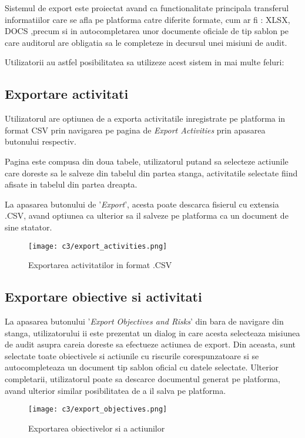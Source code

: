 Sistemul de export este proiectat avand ca functionalitate principala transferul informatiilor care se afla pe platforma catre diferite formate, cum ar fi : XLSX, DOCS ,precum si in autocompletarea unor documente oficiale de tip sablon pe care auditorul are obligatia sa le completeze in decursul unei misiuni de audit.

Utilizatorii au astfel posibilitatea sa utilizeze acest sistem in mai multe feluri:
\subsection*{Exportare activitati}
Utilizatorul are optiunea de a exporta activitatile inregistrate pe platforma in format CSV prin navigarea pe pagina de \textit{Export Activities} prin apasarea butonului respectiv.

Pagina este compusa din doua tabele, utilizatorul putand sa selecteze actiunile care doreste sa le salveze din tabelul din partea stanga, activitatile selectate fiind afisate in tabelul din partea dreapta.

La apasarea butonului de '\textit{Export}', acesta poate descarca fisierul cu extensia .CSV, avand optiunea ca ulterior sa il salveze pe platforma ca un document de sine statator.


\vspace{1cm}
\begin{figure}[h]
	\centering
	
	\texttt{[image: c3/export\_activities.png]}
	\caption{Exportarea activitatilor in format .CSV}
\end{figure}

\subsection*{Exportare obiective si activitati}
La apasarea butonului '\textit{Export Objectives and Risks}' din bara de navigare din stanga, utilizatorului ii este prezentat un dialog in care acesta selecteaza misiunea de audit asupra careia doreste sa efectueze actiunea de export. Din aceasta, sunt selectate toate obiectivele si actiunile cu riscurile corespunzatoare si se autocompleteaza un document tip sablon oficial cu datele selectate. Ulterior completarii, utilizatorul poate sa descarce documentul generat pe platforma, avand ulterior similar posibilitatea de a il salva pe platforma. 


\vspace{1cm}
\begin{figure}[h]
	\centering
	
	\texttt{[image: c3/export\_objectives.png]}
	\caption{Exportarea obiectivelor si a actiunilor }
\end{figure}



